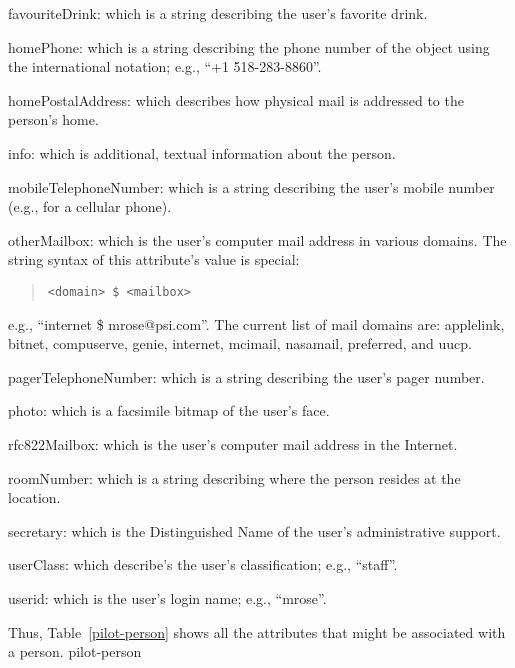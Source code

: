 \begin{describe}
\item[favouriteDrink:]
			which is a string describing the user's favorite drink.

\item[homePhone:]
		which is a string describing the phone number of the object
		using the international notation; e.g., ``+1 518-283-8860''.

\item[homePostalAddress:]
			which describes how physical mail is addressed to the
			person's home.

\item[info:]
			which is additional, textual information about the
			person.

\item[mobileTelephoneNumber:]
			which is a string describing the user's mobile
			number (e.g., for a cellular phone).

\item[otherMailbox:]
			which is the user's computer mail address
			in various domains.
			The string syntax of this attribute's value is special:
\begin{quote}\small\begin{verbatim}
<domain> $ <mailbox>
\end{verbatim}\end{quote}
			e.g., ``internet \$ mrose@psi.com''.
The current list of mail domains are:
applelink, bitnet, compuserve, genie, internet, mcimail, nasamail,
preferred, and uucp.

\item[pagerTelephoneNumber:]
			which is a string describing the user's pager number.

\item[photo:]
			which is a facsimile bitmap of the user's face.

\item[rfc822Mailbox:]
			which is the user's computer mail address in the
			Internet.

\item[roomNumber:]
			which is a string describing where the person resides
			at the location.

\item[secretary:]
			which is the Distinguished Name of the user's
			administrative support.

\item[userClass:]
			which describe's the user's classification; e.g.,
			``staff''.

\item[userid:]
			which is the user's login name; e.g., ``mrose''.
\end{describe}
Thus,
Table~\ref{pilot-person} shows all the attributes that might be associated
with a person.
%
	{pilot-person}

